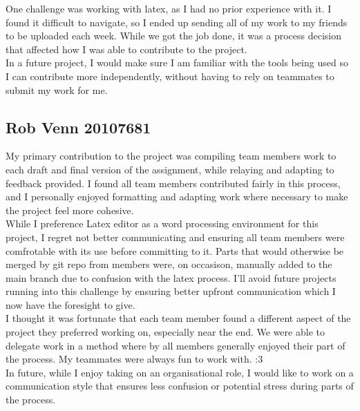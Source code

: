 One challenge was working with latex, as I had no prior experience with it. I found it difficult to navigate, so I ended up sending all of my work to my friends to be uploaded each week. While we got the job done, it was a process decision that affected how I was able to contribute to the project. \\

In a future project, I would make sure I am familiar with the tools being used so I can contribute more independently, without having to rely on teammates to submit my work for me. \\

\subsection*{Rob Venn 20107681}
My primary contribution to the project was compiling team members work to each draft and final version of the assignment, while relaying and adapting to feedback provided. I found all team members contributed fairly in this process, and I personally enjoyed formatting and adapting work where necessary to make the project feel more cohesive.\\

While I preference Latex editor as a word processing environment for this project, I regret not better communicating and ensuring all team members were comfrotable with its use before committing to it. Parts that would otherwise be merged by git repo from members were, on occasison, manually added to the main branch due to confusion with the latex process. I'll avoid future projects running into this challenge by ensuring better upfront communication which I now have the foresight to give. \\

I thought it was fortunate that each team member found a different aspect of the project they preferred working on, especially near the end. We were able to delegate work in a method where by all members generally enjoyed their part of the process. My teammates were always fun to work with. :3\\

In future, while I enjoy taking on an organisational role, I would like to work on a communication style that ensures less confusion or potential stress during parts of the process. \\

